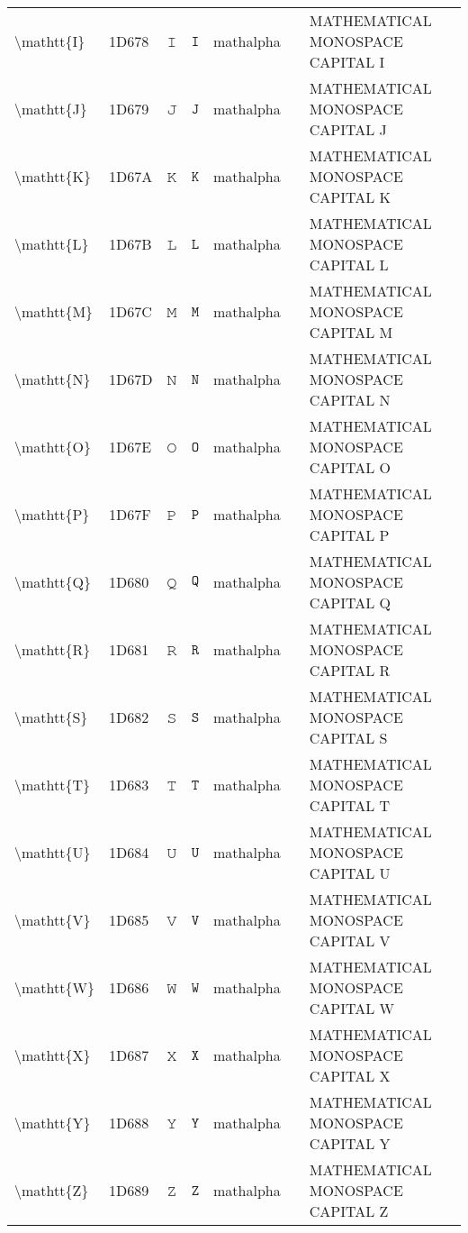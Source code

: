 \documentclass[a4paper,landscape]{article}
\begin{document}
\begin{longtable}{llcclll}
\textbackslash{}mathtt\{I\} & 1D678 & 𝙸 & $\mathtt{I}$ & mathalpha &  & MATHEMATICAL MONOSPACE CAPITAL I \\
\textbackslash{}mathtt\{J\} & 1D679 & 𝙹 & $\mathtt{J}$ & mathalpha &  & MATHEMATICAL MONOSPACE CAPITAL J \\
\textbackslash{}mathtt\{K\} & 1D67A & 𝙺 & $\mathtt{K}$ & mathalpha &  & MATHEMATICAL MONOSPACE CAPITAL K \\
\textbackslash{}mathtt\{L\} & 1D67B & 𝙻 & $\mathtt{L}$ & mathalpha &  & MATHEMATICAL MONOSPACE CAPITAL L \\
\textbackslash{}mathtt\{M\} & 1D67C & 𝙼 & $\mathtt{M}$ & mathalpha &  & MATHEMATICAL MONOSPACE CAPITAL M \\
\textbackslash{}mathtt\{N\} & 1D67D & 𝙽 & $\mathtt{N}$ & mathalpha &  & MATHEMATICAL MONOSPACE CAPITAL N \\
\textbackslash{}mathtt\{O\} & 1D67E & 𝙾 & $\mathtt{O}$ & mathalpha &  & MATHEMATICAL MONOSPACE CAPITAL O \\
\textbackslash{}mathtt\{P\} & 1D67F & 𝙿 & $\mathtt{P}$ & mathalpha &  & MATHEMATICAL MONOSPACE CAPITAL P \\
\textbackslash{}mathtt\{Q\} & 1D680 & 𝚀 & $\mathtt{Q}$ & mathalpha &  & MATHEMATICAL MONOSPACE CAPITAL Q \\
\textbackslash{}mathtt\{R\} & 1D681 & 𝚁 & $\mathtt{R}$ & mathalpha &  & MATHEMATICAL MONOSPACE CAPITAL R \\
\textbackslash{}mathtt\{S\} & 1D682 & 𝚂 & $\mathtt{S}$ & mathalpha &  & MATHEMATICAL MONOSPACE CAPITAL S \\
\textbackslash{}mathtt\{T\} & 1D683 & 𝚃 & $\mathtt{T}$ & mathalpha &  & MATHEMATICAL MONOSPACE CAPITAL T \\
\textbackslash{}mathtt\{U\} & 1D684 & 𝚄 & $\mathtt{U}$ & mathalpha &  & MATHEMATICAL MONOSPACE CAPITAL U \\
\textbackslash{}mathtt\{V\} & 1D685 & 𝚅 & $\mathtt{V}$ & mathalpha &  & MATHEMATICAL MONOSPACE CAPITAL V \\
\textbackslash{}mathtt\{W\} & 1D686 & 𝚆 & $\mathtt{W}$ & mathalpha &  & MATHEMATICAL MONOSPACE CAPITAL W \\
\textbackslash{}mathtt\{X\} & 1D687 & 𝚇 & $\mathtt{X}$ & mathalpha &  & MATHEMATICAL MONOSPACE CAPITAL X \\
\textbackslash{}mathtt\{Y\} & 1D688 & 𝚈 & $\mathtt{Y}$ & mathalpha &  & MATHEMATICAL MONOSPACE CAPITAL Y \\
\textbackslash{}mathtt\{Z\} & 1D689 & 𝚉 & $\mathtt{Z}$ & mathalpha &  & MATHEMATICAL MONOSPACE CAPITAL Z \\

\end{longtable}
\end{document}
